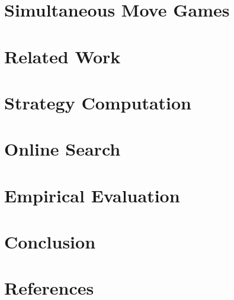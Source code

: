 \documentclass[preprint,12pt]{elsarticle}
\newcommand{\reviewchange}[1]{{\color{blue}#1}}
\newcounter{bbNoteCounter}
\newcommand{\bbosansky}[1]{{\small \color{orange} $\blacktriangle$ \refstepcounter{bbNoteCounter}\textsf{[BB]$_{\arabic{bbNoteCounter}}$:{#1}}}}
\begin{document}
\section{Simultaneous Move Games}  \label{sec:smg}



\section{Related Work} \label{sec:relwork}



\section{Strategy Computation} \label{sec:offline}



\section{Online Search} \label{sec:online}




\section{Empirical Evaluation} \label{sec:eval}



\section{Conclusion} \label{sec:conc}




\section*{References}











\end{document}
